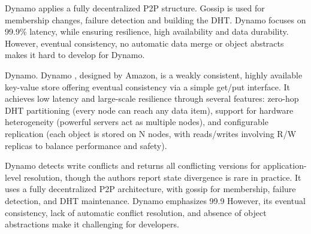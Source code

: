 Dynamo applies a fully decentralized P2P structure.
Gossip is used for membership changes, failure detection and building the DHT.
Dynamo focuses on 99.9\% latency, while ensuring resilience, high availability and data durability.
However, eventual consistency, no automatic data merge or object abstracts makes it hard to develop for Dynamo.

Dynamo. Dynamo \cite{dynamo}, designed by Amazon, is a weakly consistent, highly available key-value store offering eventual consistency via a simple get/put interface.
It achieves low latency and large-scale resilience through several features: zero-hop DHT partitioning (every node can reach any data item), support for hardware heterogeneity (powerful servers act as multiple nodes), and configurable replication (each object is stored on N nodes, with reads/writes involving R/W replicas to balance performance and safety).

Dynamo detects write conflicts and returns all conflicting versions for application-level resolution, though the authors report state divergence is rare in practice.
It uses a fully decentralized P2P architecture, with gossip for membership, failure detection, and DHT maintenance.
Dynamo emphasizes 99.9%
However, its eventual consistency, lack of automatic conflict resolution, and absence of object abstractions make it challenging for developers.


%

